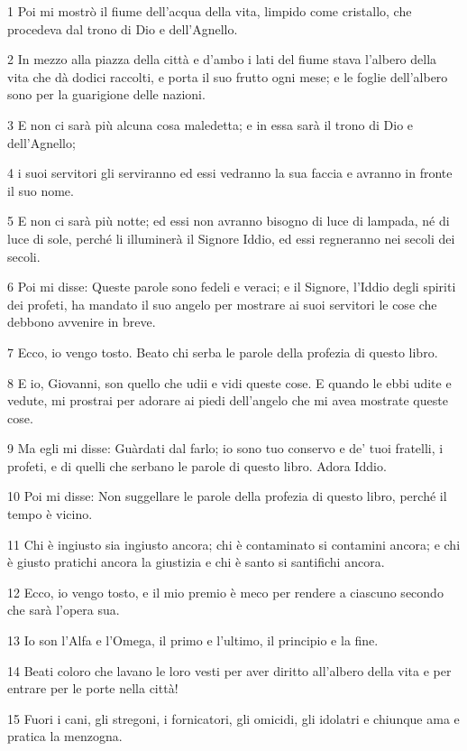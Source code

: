 \par 1 Poi mi mostrò il fiume dell'acqua della vita, limpido come cristallo, che procedeva dal trono di Dio e dell'Agnello.
\par 2 In mezzo alla piazza della città e d'ambo i lati del fiume stava l'albero della vita che dà dodici raccolti, e porta il suo frutto ogni mese; e le foglie dell'albero sono per la guarigione delle nazioni.
\par 3 E non ci sarà più alcuna cosa maledetta; e in essa sarà il trono di Dio e dell'Agnello;
\par 4 i suoi servitori gli serviranno ed essi vedranno la sua faccia e avranno in fronte il suo nome.
\par 5 E non ci sarà più notte; ed essi non avranno bisogno di luce di lampada, né di luce di sole, perché li illuminerà il Signore Iddio, ed essi regneranno nei secoli dei secoli.
\par 6 Poi mi disse: Queste parole sono fedeli e veraci; e il Signore, l'Iddio degli spiriti dei profeti, ha mandato il suo angelo per mostrare ai suoi servitori le cose che debbono avvenire in breve.
\par 7 Ecco, io vengo tosto. Beato chi serba le parole della profezia di questo libro.
\par 8 E io, Giovanni, son quello che udii e vidi queste cose. E quando le ebbi udite e vedute, mi prostrai per adorare ai piedi dell'angelo che mi avea mostrate queste cose.
\par 9 Ma egli mi disse: Guàrdati dal farlo; io sono tuo conservo e de' tuoi fratelli, i profeti, e di quelli che serbano le parole di questo libro. Adora Iddio.
\par 10 Poi mi disse: Non suggellare le parole della profezia di questo libro, perché il tempo è vicino.
\par 11 Chi è ingiusto sia ingiusto ancora; chi è contaminato si contamini ancora; e chi è giusto pratichi ancora la giustizia e chi è santo si santifichi ancora.
\par 12 Ecco, io vengo tosto, e il mio premio è meco per rendere a ciascuno secondo che sarà l'opera sua.
\par 13 Io son l'Alfa e l'Omega, il primo e l'ultimo, il principio e la fine.
\par 14 Beati coloro che lavano le loro vesti per aver diritto all'albero della vita e per entrare per le porte nella città!
\par 15 Fuori i cani, gli stregoni, i fornicatori, gli omicidi, gli idolatri e chiunque ama e pratica la menzogna.
